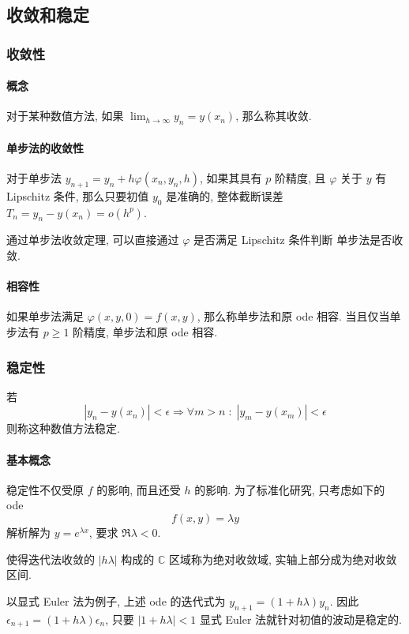 \documentclass{ctexart}
\newcommand{\Cset}{\mathbb{C}}
\begin{document}
\subsection{收敛和稳定}
\subsubsection{收敛性}
\paragraph{概念}
    对于某种数值方法, 如果 $\lim_{h \to \infty} y_n = y(x_n)$, 那么称其收敛.
\paragraph{单步法的收敛性}
    对于单步法 $y_{n+1} = y_n + h \varphi(x_n, y_n, h)$, 如果其具有 $p$ 阶精度,
    且 $\varphi$ 关于 $y$ 有 Lipschitz 条件, 那么只要初值 $y_0$ 是准确的,
    整体截断误差 $T_{n} = y_n - y(x_n) = o(h^p)$.\par
    通过单步法收敛定理, 可以直接通过 $\varphi$ 是否满足 Lipschitz 条件判断
    单步法是否收敛.
\paragraph{相容性}
    如果单步法满足 $\varphi(x, y, 0) = f(x, y)$, 那么称单步法和原 ode 相容.
    当且仅当单步法有 $p \ge 1$ 阶精度, 单步法和原 ode 相容.
\subsubsection{稳定性}
    若 \[
        |y_n - y(x_n)| < \epsilon \Rightarrow \forall m > n\;:\; |y_m - y(x_m)| < \epsilon\]
    则称这种数值方法稳定.
\paragraph{基本概念}
    稳定性不仅受原 $f$ 的影响, 而且还受 $h$ 的影响. 为了标准化研究, 只考虑如下的 ode \[
        f(x, y) = \lambda y\]
    解析解为 $y = e^{\lambda x}$, 要求 $\Re \lambda < 0$.\par
    使得迭代法收敛的 $|h\lambda|$ 构成的 $\Cset$ 区域称为绝对收敛域, 实轴上部分成为绝对收敛区间.\par
    以显式 Euler 法为例子, 上述 ode 的迭代式为 $y_{n+1} = (1+h\lambda) y_n$.
    因此 $\epsilon_{n+1} = (1 + h\lambda) \epsilon_{n}$, 只要 $|1 + h\lambda| < 1$
    显式 Euler 法就针对初值的波动是稳定的.\par
\end{document}
